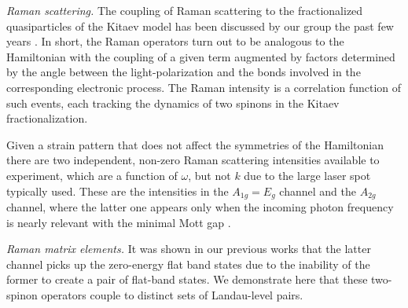 \documentclass[reprint,amsmath,amssymb,aps,prl,groupedaddress,nofootinbib,superscriptaddress]{revtex4-1}
\newcommand{\1}{\mathds{1}}
\begin{document}
{\it Raman scattering.} 
The coupling of Raman scattering to the fractionalized quasiparticles of the Kitaev model has been discussed by our group the past few years \cite{Knolle14-2,Perreault15,Perreault16-1,Perreault16-2}. In short, the Raman operators turn out to be analogous to the Hamiltonian with the coupling of a given term augmented by factors determined by the angle between the light-polarization and the bonds involved in the corresponding electronic process. The Raman intensity is a correlation function of such events, each tracking the dynamics of two spinons in the Kitaev fractionalization.

Given a strain pattern that does not affect the symmetries of the Hamiltonian there are two independent, non-zero Raman scattering intensities available to experiment, which are a function of $\omega$, but not $k$ due to the large laser spot typically used. These are the intensities in the $A_{1g}=E_{g}$ channel and the $A_{2g}$ channel, where the latter one appears only when the incoming photon frequency is nearly relevant with the minimal Mott gap \cite{Perreault16-1}.

{\it Raman matrix elements.}
It was shown in our previous works that the latter channel picks up the zero-energy flat band states due to the inability of the former to create a pair of flat-band states. We demonstrate here that these two-spinon operators couple to distinct sets of Landau-level pairs. 
\end{document}
